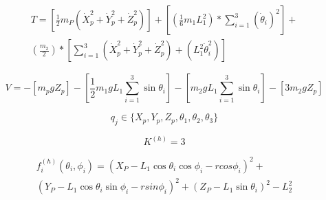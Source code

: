         \vspace{-0.8cm}
        \begin{multline}
         T= \left[ \frac{1}{2}m_{P} \left( \dot{X}_{p}^{2}+\dot{Y}_{p}^{2}+\dot{Z}_{p}^{2} \right)  \right] + \left[  \left( \frac{1}{6}m_{1}L_{1}^{2} \right) \ast \sum _{i=1}^{3} \left( \dot{ \theta }_{i} \right) ^{2} \right] + \\
          \left( \frac{m_{2}}{2} \right) \ast \left[  \sum _{i=1}^{3} \left( \dot{X}_{p}^{2}+\dot{Y}_{p}^{2}+\dot{Z}_{p}^{2} \right) + \left( L_{1}^{2}\dot{ \theta }_{i}^{2} \right)  \right]
        \label{eq:cap4_dina_ma_7}
        \end{multline}
        \vspace{-0.8cm}
 
        \begin{equation}
         V=- \left[ m_{p}gZ_{p} \right] - \left[ \frac{1}{2}m_{1}gL_{1} \sum _{i=1}^{3}\sin  \theta _{i} \right] - \left[ m_{2}gL_{1} \sum _{i=1}^{3}\sin  \theta _{i} \right] - \left[ 3m_{2}gZ_{p} \right]
        \label{eq:cap4_dina_ma_8}
        \end{equation}
        
        \begin{equation}
         q_{j} \in \{X_{p},Y_{p},Z_{p}, \theta _{1}, \theta _{2}, \theta _{3} \}
        \label{eq:cap4_dina_ma_9}
        \end{equation}
        
        \begin{equation}
         K^{ \left( h \right) }=3
        \label{eq:cap4_dina_ma_10}
        \end{equation}

        \vspace{-1cm}
        \begin{multline}
             f_{i}^{ \left( h \right) } \left(  \theta _{i}, \phi _{i} \right) = \left( X_{P}-L_{1}\cos  \theta _{i}\cos  \phi _{i}- rcos \phi _{i} \right) ^{2}+ \\ 
             \left( Y_{P}-L_{1}\cos  \theta _{i}\sin  \phi _{i}- rsin \phi _{i} \right) ^{2}+ \left( Z_{P}-L_{1}\sin  \theta _{i} \right) ^{2}-L_{2}^{2}
        \label{eq:cap4_dina_ma_11}
        \end{multline}
        
